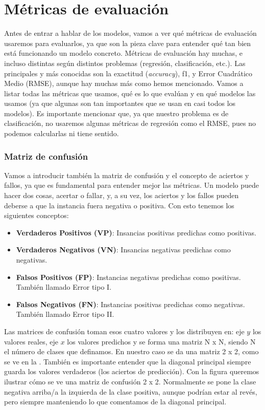 \section{Métricas de evaluación}
\label{sec:metricas_evaluacion}

Antes de entrar a hablar de los modelos, vamos a ver qué métricas de evaluación usaremos para evaluarlos, ya que son la pieza clave para entender qué tan bien está funcionando un modelo concreto. Métricas de evaluación hay muchas, e incluso distintas según distintos problemas (regresión, clasificación, etc.). Las principales y más conocidas son la exactitud (\textit{accuracy}), f1, y Error Cuadrático Medio (RMSE), aunque hay muchas más como hemos mencionado. Vamos a listar todas las métricas que usamos, qué es lo que evalúan y en qué modelos las usamos (ya que algunas son tan importantes que se usan en casi todos los modelos). Es importante mencionar que, ya que nuestro problema es de clasificación, no usaremos algunas métricas de regresión como el RMSE, pues no podemos calcularlas ni tiene sentido. \\

\subsubsection*{Matriz de confusión}

Vamos a introducir también la matriz de confusión y el concepto de aciertos y fallos, ya que es fundamental para entender mejor las métricas. Un modelo puede hacer dos cosas, acertar o fallar, y, a su vez, los aciertos y los fallos pueden deberse a que la instancia fuera negativa o positiva. Con esto tenemos los siguientes conceptos:

\begin{itemize}
	\item \textbf{Verdaderos Positivos (VP)}: Insancias positivas predichas como positivas.
	\item \textbf{Verdaderos Negativos (VN)}: Insancias negativas predichas como negativas.
	\item \textbf{Falsos Positivos (FP)}: Instancias negativas predichas como positivas. También llamado Error tipo I.
	\item \textbf{Falsos Negativos (FN)}: Instancias positivas predichas como negativas. También llamado Error tipo II.
\end{itemize}

Las matrices de confusión toman esos cuatro valores y los distribuyen en: eje $y$ los valores reales, eje $x$ los valores predichos y se forma una matriz N x N, siendo N el número de clases que definamos. En nuestro caso se da una matriz 2 x 2, como se ve en la . También es importante entender que la diagonal principal siempre guarda los valores verdaderos (los aciertos de predicción). Con la figura queremos ilustrar cómo se ve una matriz de confusión 2 x 2. Normalmente se pone la clase negativa arriba/a la izquierda de la clase positiva, aunque podrían estar al revés, pero siempre manteniendo lo que comentamos de la diagonal principal.

